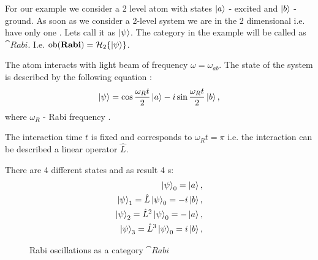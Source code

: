 \begin{example}  
  \label{ex:rabioscillations}
  For our example we consider a 2 level atom with states $\ket{a}$ -
  excited and $\ket{b}$ - ground.
  As soon as we consider a 2-level system we are in the 2 dimensional
   i.e. have only one
  . Lets call 
  it as $\ket{\psi}$. The category in the example will be called as
  $\cat{Rabi}$. I.e. $\mathrm{ob}(\mathbf{Rabi}) = \mathcal{H}_2
  \{\ket{\psi}\}$.  

  The atom interacts with light beam of
  frequency $\omega = \omega_{ab}$. The state of the system is
  described by the following equation \cite{bib:quantum_optics_mine}:
  \begin{equation}
    \ket{\psi} = \cos{\frac{\omega_R t}{2}} \ket{a} -
      i \sin{\frac{\omega_R t}{2}} \ket{b},
    \nonumber
  \end{equation}
  where $\omega_R$ - Rabi frequency \cite{bib:quantum_optics_mine}. 

  The interaction time $t$ is fixed and corresponds to $\omega_R t =
  \pi$ i.e. the interaction can be described a linear operator $\hat{L}$.
  
  There are 4 different states and as result 4
  s:
  \begin{eqnarray}
    \ket{\psi}_0 = \ket{a},
    \nonumber \\
    \ket{\psi}_1 = \hat{L} \ket{\psi}_0 = -i \ket{b},
    \nonumber \\
    \ket{\psi}_2 = \hat{L}^2 \ket{\psi}_0 = - \ket{a},
    \nonumber \\
    \ket{\psi}_3 = \hat{L}^3 \ket{\psi}_0 = i \ket{b},
    \nonumber
  \end{eqnarray}

\begin{figure}
  \centering
  \caption{Rabi oscillations as a category $\cat{Rabi}$}
  \label{fig:example_quantum}
\end{figure}
\end{example}
